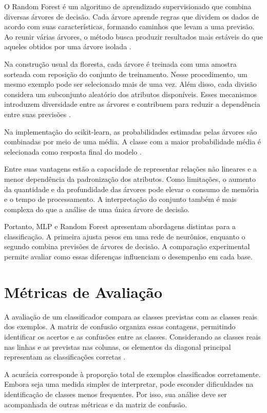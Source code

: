 \documentclass[12pt, oneside, a4paper, english, brazilian]{abntex2}
\begin{document}
O Random Forest é um algoritmo de aprendizado supervisionado que combina diversas árvores de decisão. Cada árvore aprende regras que dividem os dados de acordo com suas características, formando caminhos que levam a uma previsão. Ao reunir várias árvores, o método busca produzir resultados mais estáveis do que aqueles obtidos por uma árvore isolada \cite{breiman2001random}.

Na construção usual da floresta, cada árvore é treinada com uma amostra sorteada com reposição do conjunto de treinamento. Nesse procedimento, um mesmo exemplo pode ser selecionado mais de uma vez. Além disso, cada divisão considera um subconjunto aleatório dos atributos disponíveis. Esses mecanismos introduzem diversidade entre as árvores e contribuem para reduzir a dependência entre suas previsões \cite{breiman2001random}.

Na implementação do scikit-learn, as probabilidades estimadas pelas árvores são combinadas por meio de uma média. A classe com a maior probabilidade média é selecionada como resposta final do modelo \cite{pedregosa2011scikit}.

Entre suas vantagens estão a capacidade de representar relações não lineares e a menor dependência da padronização dos atributos. Como limitações, o aumento da quantidade e da profundidade das árvores pode elevar o consumo de memória e o tempo de processamento. A interpretação do conjunto também é mais complexa do que a análise de uma única árvore de decisão.

Portanto, MLP e Random Forest apresentam abordagens distintas para a classificação. A primeira ajusta pesos em uma rede de neurônios, enquanto o segundo combina previsões de árvores de decisão. A comparação experimental permite avaliar como essas diferenças influenciam o desempenho em cada base.

\section{Métricas de Avaliação}

A avaliação de um classificador compara as classes previstas com as classes reais dos exemplos. A matriz de confusão organiza essas contagens, permitindo identificar os acertos e as confusões entre as classes. Considerando as classes reais nas linhas e as previstas nas colunas, os elementos da diagonal principal representam as classificações corretas \cite{pedregosa2011scikit}.

A acurácia corresponde à proporção total de exemplos classificados corretamente. Embora seja uma medida simples de interpretar, pode esconder dificuldades na identificação de classes menos frequentes. Por isso, sua análise deve ser acompanhada de outras métricas e da matriz de confusão.
\end{document}
